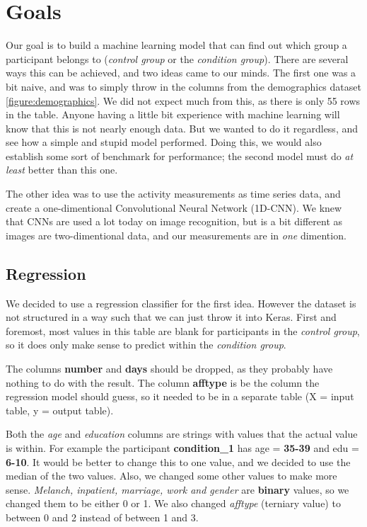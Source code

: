 \section{Goals}

Our goal is to build a machine learning model that can find out which group a participant belongs to (\textit{control group} or the \textit{condition group}).
There are several ways this can be achieved, and two ideas came to our minds. The first one was a bit naive, and was to simply throw in the columns from the 
demographics dataset \ref{figure:demographics}. We did not expect much from this, as there is only 55 rows in the table. Anyone having a little bit experience 
with machine learning will know that this is not nearly enough data. But we wanted to do it regardless, and see how a simple and stupid model performed.
Doing this, we would also establish some sort of benchmark for performance; the second model must do \textit{at least} better than this one.

The other idea was to use the activity measurements as time series data, and create a one-dimentional Convolutional Neural Network (1D-CNN). We knew that 
CNNs are used a lot today on image recognition, but is a bit different as images are two-dimentional data, and our measurements are in \textit{one} dimention.

\subsection{Regression}

We decided to use a regression classifier for the first idea. However the dataset is not structured in a way such that we can just throw it into Keras.
First and foremost, most values in this table are blank for participants in the \textit{control group}, so it does only make sense to predict within 
the \textit{condition group}. 

The columns \textbf{number} and \textbf{days} should be dropped, as they probably have nothing to do with the result. 
The column \textbf{afftype} is be the column the regression model should guess, so it needed to be in a separate table (X = input table, y = output table).

Both the \textit{age} and \textit{education} columns are strings with values that the actual value is within. For example the participant \textbf{condition\_1} 
has age = \textbf{35-39} and edu = \textbf{6-10}. It would be better to change this to one value, and we decided to use the median of the two values.
Also, we changed some other values to make more sense. \textit{Melanch, inpatient, marriage, work and gender} are \textbf{binary} values, 
so we changed them to be either 0 or 1. We also changed \textit{afftype} (terniary value) to between 0 and 2 instead of between 1 and 3.

